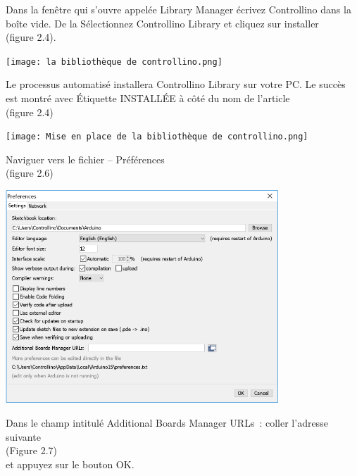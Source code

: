 \documentclass[a4paper,12pt]{report}
\begin{document}
Dans la fenêtre qui s’ouvre appelée Library Manager écrivez Controllino dans la boîte vide. De la
Sélectionnez Controllino Library et cliquez sur installer \\
(figure 2.4).\\

\begin{center}
\texttt{[image: la bibliothèque de controllino.png]}
\label{}
\end{center}

Le processus automatisé installera Controllino Library sur votre PC. Le succès est montré avec
Étiquette INSTALLÉE à côté du nom de l’article\\
(figure 2.4)\\

\begin{center}
\texttt{[image: Mise en place de la bibliothèque de controllino.png]}
\label{}
\end{center}

Naviguer vers le fichier – Préférences \\
(figure 2.6)\\

\begin{center}
\includegraphics[height=8cm]{Arduino ide préférences.png}
\label{}
\end{center}

Dans le champ intitulé Additional Boards Manager URLs : coller l’adresse suivante\\ 
(Figure 2.7)\\
et appuyez sur le bouton OK.\\
\end{document}
